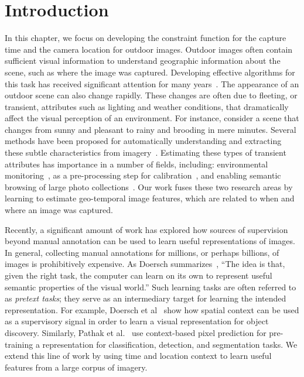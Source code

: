 \section{Introduction}

In this chapter, we focus on developing the constraint function for 
the capture time and the camera location for outdoor images.
Outdoor images often contain sufficient visual information to
understand geographic information about the scene, such as where the
image was captured. Developing effective algorithms for this task has
received significant attention for many years~\cite{im2gps,planet}.
The appearance of an outdoor scene can also change rapidly. These
changes are often due to fleeting, or transient, attributes such as
lighting and weather conditions, that dramatically affect the visual
perception of an environment. For instance, consider a scene that
changes from sunny and pleasant to rainy and brooding in mere minutes.
Several methods have been proposed for automatically understanding and
extracting these subtle characteristics from
imagery~\cite{patterson2012sun,lu2014two,laffont2014transient,baltenberger16transient}.
Estimating these types of transient attributes has importance in a
number of fields, including: environmental
monitoring~\cite{wang2013observing,fedorov2014snow}, as a
pre-processing step for
calibration~\cite{jacobs13cloudcalibration,workman2014rainbow}, and
enabling semantic browsing of large photo
collections~\cite{jacobs07amos,laffont2014transient}. Our work fuses these two
research areas by learning to estimate geo-temporal image features,
which are related to when and where an image was captured.
 
Recently, a significant amount of work has explored how sources of
supervision beyond manual annotation can be used to learn useful
representations of images. In general, collecting manual annotations
for millions, or perhaps billions, of images is prohibitively
expensive. As Doersch summarizes~\cite{doersch2016supervision}, ``The
idea is that, given the right task, the computer can learn on its own
to represent useful semantic properties of the visual world.'' Such
learning tasks are often referred to as {\em pretext tasks}; they
serve as an intermediary target for learning the intended
representation.  For example, Doersch et
al~\cite{doersch2015unsupervised} show how spatial context can be used
as a supervisory signal in order to learn a visual representation for
object discovery. Similarly, Pathak et al.~\cite{pathak2016context}
use context-based pixel prediction for pre-training a representation
for classification, detection, and segmentation tasks. We extend this
line of work by using time and location context to learn useful
features from a large corpus of imagery.

